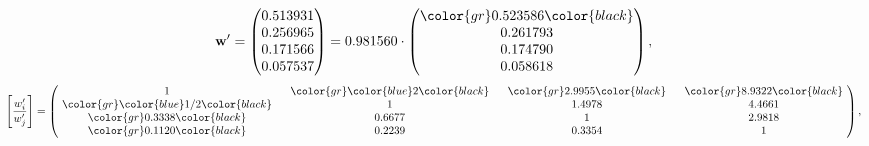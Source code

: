 \begin{example}
\begin{equation*}
\mathbf{w}^{\prime} =
\begin{pmatrix}
0.513931\\
0.256965\\
0.171566\\
0.057537
\end{pmatrix} =
0.981560\cdot
\begin{pmatrix}
\color{gr} 0.523586\color{black} \\
0.261793\\
0.174790\\
0.058618
\end{pmatrix},
\end{equation*}
\begin{equation*}
\left[ \frac{{w}^{\prime}_i}{{w}^{\prime}_j} \right] =
\begin{pmatrix}
$\,\,$ 1 $\,\,$ & $\,\,$\color{gr} \color{blue} 2\color{black} $\,\,$ & $\,\,$\color{gr} 2.9955\color{black} $\,\,$ & $\,\,$\color{gr} 8.9322\color{black} $\,\,$ \\
$\,\,$\color{gr} \color{blue}  1/2\color{black} $\,\,$ & $\,\,$ 1 $\,\,$ & $\,\,$1.4978$\,\,$ & $\,\,$4.4661  $\,\,$ \\
$\,\,$\color{gr} 0.3338\color{black} $\,\,$ & $\,\,$0.6677$\,\,$ & $\,\,$ 1 $\,\,$ & $\,\,$2.9818 $\,\,$ \\
$\,\,$\color{gr} 0.1120\color{black} $\,\,$ & $\,\,$0.2239$\,\,$ & $\,\,$0.3354$\,\,$ & $\,\,$ 1  $\,\,$ \\
\end{pmatrix},
\end{equation*}
\end{example}
\newpage
